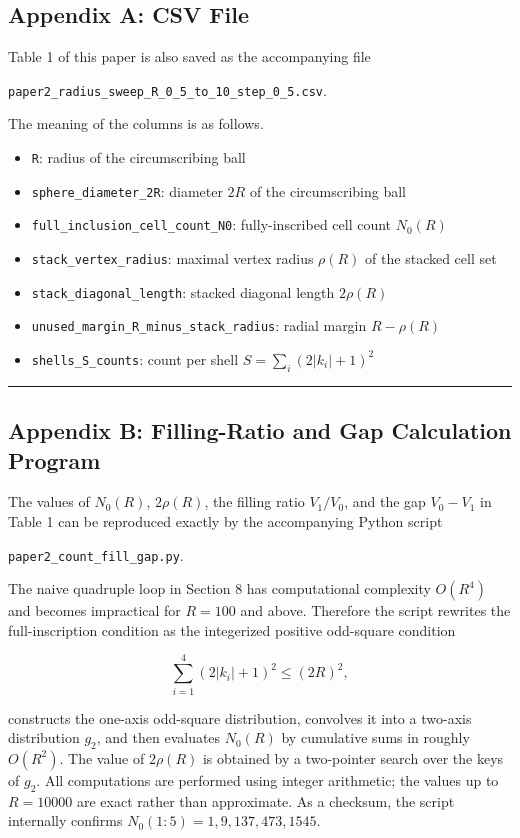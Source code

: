 \documentclass[
]{article}
\providecommand{\tightlist}{%
  \setlength{\itemsep}{0pt}\setlength{\parskip}{0pt}}
\begin{document}
\subsection{Appendix A: CSV File}\label{appendix-a-csv-file}

Table 1 of this paper is also saved as the accompanying file

\texttt{paper2\_radius\_sweep\_R\_0\_5\_to\_10\_step\_0\_5.csv}.

The meaning of the columns is as follows.

\begin{itemize}
\tightlist
\item
  \texttt{R}: radius of the circumscribing ball
\item
  \texttt{sphere\_diameter\_2R}: diameter \(2R\) of the circumscribing
  ball
\item
  \texttt{full\_inclusion\_cell\_count\_N0}: fully-inscribed cell count
  \(N_0(R)\)
\item
  \texttt{stack\_vertex\_radius}: maximal vertex radius \(\rho(R)\) of
  the stacked cell set
\item
  \texttt{stack\_diagonal\_length}: stacked diagonal length \(2\rho(R)\)
\item
  \texttt{unused\_margin\_R\_minus\_stack\_radius}: radial margin
  \(R-\rho(R)\)
\item
  \texttt{shells\_S\_counts}: count per shell \(S=\sum_i(2|k_i|+1)^2\)
\end{itemize}

\begin{center}\rule{0.5\linewidth}{0.5pt}\end{center}

\subsection{Appendix B: Filling-Ratio and Gap Calculation
Program}\label{appendix-b-filling-ratio-and-gap-calculation-program}

The values of \(N_0(R)\), \(2\rho(R)\), the filling ratio \(V_1/V_0\),
and the gap \(V_0-V_1\) in Table 1 can be reproduced exactly by the
accompanying Python script

\texttt{paper2\_count\_fill\_gap.py}.

The naive quadruple loop in Section 8 has computational complexity
\(O(R^4)\) and becomes impractical for \(R=100\) and above. Therefore
the script rewrites the full-inscription condition as the integerized
positive odd-square condition

\[
\sum_{i=1}^{4}(2|k_i|+1)^2\le(2R)^2,
\]

constructs the one-axis odd-square distribution, convolves it into a
two-axis distribution \(g_2\), and then evaluates \(N_0(R)\) by
cumulative sums in roughly \(O(R^2)\). The value of \(2\rho(R)\) is
obtained by a two-pointer search over the keys of \(g_2\). All
computations are performed using integer arithmetic; the values up to
\(R=10000\) are exact rather than approximate. As a checksum, the script
internally confirms \(N_0(1{:}5)=1,9,137,473,1545\).
\end{document}
